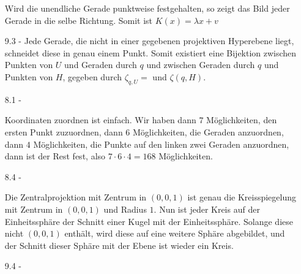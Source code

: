 \documentclass{article}
\begin{document}
\begin{enumerate}
		Wird die unendliche Gerade punktweise festgehalten, so zeigt das Bild jeder Gerade in die selbe Richtung. Somit ist $K(x) = \lambda x + v$
		\item[9.3 - \tbf{4}]
		Jede Gerade, die nicht in einer gegebenen projektiven Hyperebene liegt, schneidet diese in genau einem Punkt. Somit existiert eine Bijektion zwischen Punkten von $U$ und Geraden durch $q$ und zwischen Geraden durch $q$ und Punkten von $H$, gegeben durch $\zeta_{q,U} = $ und $\zeta(q,H)$.
		\item[8.1 - \tbf{4}]
		
		Koordinaten zuordnen ist einfach. Wir haben dann $7$ Möglichkeiten, den ersten Punkt zuzuordnen, dann $6$ Möglichkeiten, die Geraden anzuordnen, dann $4$ Möglichkeiten, die Punkte auf den linken zwei Geraden anzuordnen, dann ist der Rest fest, also $7 \cdot 6 \cdot 4 = 168$ Möglichkeiten.
		\item[8.4 - \tbf{4}] 
		
		Die Zentralprojektion mit Zentrum in $(0,0,1)$ ist genau die Kreisspiegelung mit Zentrum in $(0,0,1)$ und Radius $1$. Nun ist jeder Kreis auf der Einheitssphäre der Schnitt einer Kugel mit der Einheitssphäre. Solange diese nicht $(0,0,1)$ enthält, wird diese auf eine weitere Sphäre abgebildet, und der Schnitt dieser Sphäre mit der Ebene ist wieder ein Kreis.
		\item[9.4 - \tbf{3}]
		

\end{enumerate}
\end{document}

